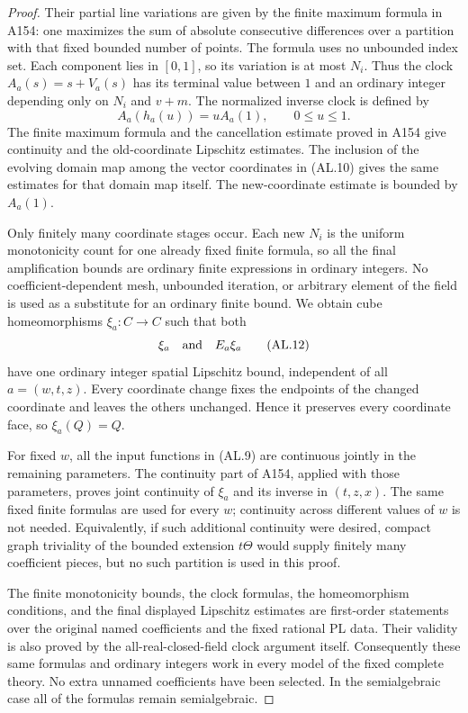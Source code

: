 \begin{proof}
Their partial line variations are given by the finite maximum formula
in A154: one maximizes the sum of absolute consecutive differences
over a partition with that fixed bounded number of points. The formula
uses no unbounded index set. Each component lies in $[0,1]$, so its
variation is at most $N_i$. Thus the clock
$A_a(s)=s+V_a(s)$ has its terminal value between $1$ and an ordinary
integer depending only on $N_i$ and $v+m$. The normalized inverse clock
is defined by
\[
 A_a(h_a(u))=u A_a(1),\qquad0\le u\le1.
 \tag{AL.11}
\]
The finite maximum formula and the cancellation estimate proved in
A154 give continuity and the old-coordinate Lipschitz estimates.
The inclusion of the evolving domain map among the vector coordinates
in (AL.10) gives the same estimates for that domain map itself.
The new-coordinate estimate is bounded by $A_a(1)$.

Only finitely many coordinate stages occur. Each new $N_i$ is the
uniform monotonicity count for one already fixed finite formula, so
all the final amplification bounds are ordinary finite expressions
in ordinary integers. No coefficient-dependent mesh, unbounded
iteration, or arbitrary element of the field is used as a substitute
for an ordinary finite bound. We obtain cube homeomorphisms
$\xi_a:C\to C$ such that both
\[
 \xi_a\quad\hbox{and}\quad E_a\xi_a
 \tag{AL.12}
\]
have one ordinary integer spatial Lipschitz bound, independent of all
$a=(w,t,z)$. Every coordinate change fixes the endpoints of the changed
coordinate and leaves the others unchanged. Hence it preserves every
coordinate face, so $\xi_a(Q)=Q$.

For fixed $w$, all the input functions in (AL.9) are continuous jointly
in the remaining parameters. The continuity part of A154, applied with
those parameters, proves joint continuity of $\xi_a$ and its inverse
in $(t,z,x)$. The same fixed finite formulas are used for every $w$;
continuity across different values of $w$ is not needed. Equivalently,
if such additional continuity were desired, compact graph triviality
of the bounded extension $t\Theta$ would supply finitely many
coefficient pieces, but no such partition is used in this proof.

The finite monotonicity bounds, the clock formulas, the homeomorphism
conditions, and the final displayed Lipschitz estimates are first-order
statements over the original named coefficients and the fixed rational
PL data. Their validity is also proved by the all-real-closed-field
clock argument itself. Consequently these same formulas and ordinary
integers work in every model of the fixed complete theory. No extra
unnamed coefficients have been selected. In the semialgebraic case
all of the formulas remain semialgebraic.


\end{proof}
